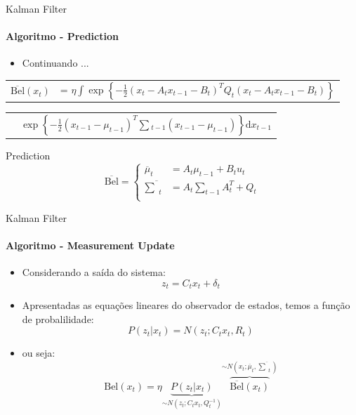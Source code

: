 \documentclass[aspectratio=169]{beamer}
\begin{document}
\begin{frame}[c]{Kalman Filter}
    \framesubtitle{Algoritmo - Prediction}

    \begin{itemize}
        \item Continuando ...
    \end{itemize}

    \begin{tabular}{p{1.2cm} l}      
        $\overline{\text{Bel}}(x_t)$  & = $\eta \displaystyle\int \exp\left\{  -\frac{1}{2} \left(x_t - A_t x_{t-1} - B_t\right)^T Q_t \left(x_t - A_t x_{t-1} - B_t\right)  \right\}$ \\
    \end{tabular}
        
    \begin{tabular}{p{2.3cm} l}
        & $\exp\left\{ -\displaystyle\frac{1}{2} \left(x_{t-1} - \mu_{t-1}\right)^T \textstyle\sum {}_{t-1} \left(x_{t-1} - \mu_{t-1}\right)  \right\}\text{d}x_{t-1}$
    \end{tabular}    

    \begin{block}{Prediction}
        \begin{equation}
            \overline{\text{Bel}} = 
            \left\{
            \begin{aligned}
                    \overline{\mu}_t & = A_t\mu_{t-1} + B_t u_t\\
                    \overline{\textstyle\sum}_t & = A_t {\textstyle\sum}_{t-1} A_t^T+ Q_t\\
            \end{aligned} \right.
        \end{equation}
    \end{block} 
\end{frame}


\begin{frame}[c]{Kalman Filter}
    \framesubtitle{Algoritmo - Measurement Update}
    \begin{itemize}
        \item Considerando a saída do sistema:
        \begin{equation*}
            z_t = C_t x_t + \delta_t
        \end{equation*}
        \item Apresentadas as equações lineares do observador de estados, temos a função de probalilidade:
        \begin{equation*}
            P(z_t| x_t)= N\left(z_t; C_t x_t, R_t\right)
        \end{equation*}   
        \item ou seja:
        \begin{equation*}
            \text{Bel}(x_t)  = \eta \underbrace{P(z_t|x_t)}_{\sim N\left(z_t; C_t x_t, Q_t^{-1}\right)} \overbrace{\overline{\text{Bel}}(x_t)}^{\sim N\left(x_t; \overline{\mu}_t, \overline{\textstyle\sum}_t\right)}
        \end{equation*}
    \end{itemize}
\end{frame}
\end{document}
